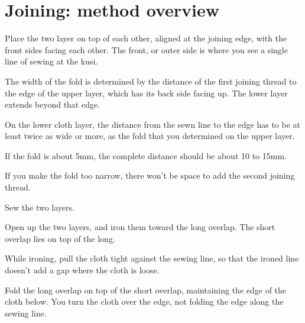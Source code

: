\clearpage

\section{Joining: method overview}

Place the two layer on top of each other, aligned at the joining edge,
with the front sides facing each other. The front, or outer side is
where you see a single line of sewing at the kusi.



The width of the fold is determined by the distance of the first joining
thread to the edge of the upper layer, which has its back side facing
up. The lower layer extends beyond that edge.

On the lower cloth layer, the distance from the sewn line to the edge
has to be at least twice as wide or more, as the fold that you
determined on the upper layer.

If the fold is about 5mm, the complete distance should be about 10 to
15mm.

If you make the fold too narrow, there won't be space to add the second
joining thread.

Sew the two layers.



\clearpage

Open up the two layers, and iron them toward the long overlap. The short
overlap lies on top of the long.



While ironing, pull the cloth tight against the sewing line, so that the
ironed line doesn't add a gap where the cloth is loose.


Fold the long overlap on top of the short overlap, maintaining the edge
of the cloth below. You turn the cloth over the edge, not folding the
edge along the sewing line.


